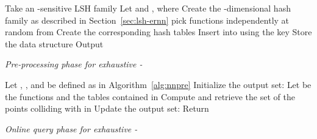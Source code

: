 \begin{algorithm}[!htb]
\LinesNumbered


  \BlankLine

  Take an -sensitive LSH family \; 
  Let  and , where \;
  Create the -dimensional hash family  as described in Section~\ref{sec:lsh-ernn}\;
   {  
    pick  functions  independently at random from \;
    Create the corresponding hash tables \;
    \ForAll{} {
       {
        Insert  into  using the key \;
      }
    }
    Store the data structure \;
  }
  Output \;


  \caption{\em Pre-processing phase for exhaustive -\pleb}
  \label{alg:nnpre}
\end{algorithm}

\begin{algorithm}[!hbt]
\LinesNumbered


\BlankLine

  Let , ,   and  be defined as in Algorithm~\ref{alg:nnpre}\;
  Initialize the output set: \;
   {
    Let   be the functions and
     the tables contained in \;
     {
      Compute  and retrieve the set  of the points colliding with  in \;
      \ForAll{} {
         {
          Update the output set:
          \;
        }
      }
    }
  }
  Return \;


  \caption{\em Online query phase for exhaustive -\pleb}
  \label{alg:nnquery}
\end{algorithm}


